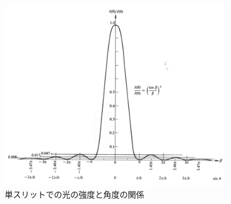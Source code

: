 \documentclass[10pt]{ujarticle}
\begin{document}
\begin{figure}[h]
\begin{center}
\includegraphics[width=10cm, bb = 0 0 1000 800]{SummerChallenge_slit.png}
\caption{単スリットでの光の強度と角度の関係}
\end{center}
\end{figure}

\clearpage
\end{document}
